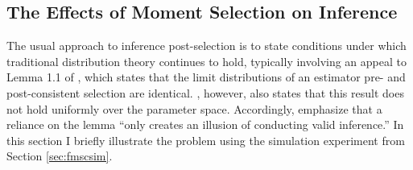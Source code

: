 \documentclass[12pt]{article}
\theoremstyle{definition}
\begin{document}
\subsection{The Effects of Moment Selection on Inference}
The usual approach to inference post-selection is to state conditions under which traditional distribution theory continues to hold, typically involving an appeal to Lemma 1.1 of \citet[p.\ 168]{Poetscher1991}, which states that the limit distributions of an estimator pre- and post-consistent selection are identical. \citet[pp.\ 179--180]{Poetscher1991}, however, also states that this result does not hold uniformly over the parameter space. 
Accordingly, \citet[p.\ 22]{LeebPoetscher2005} emphasize that a reliance on the lemma ``only creates an illusion of conducting valid inference.'' In this section I briefly illustrate the problem using the simulation experiment from Section \ref{sec:fmscsim}.
\end{document}

